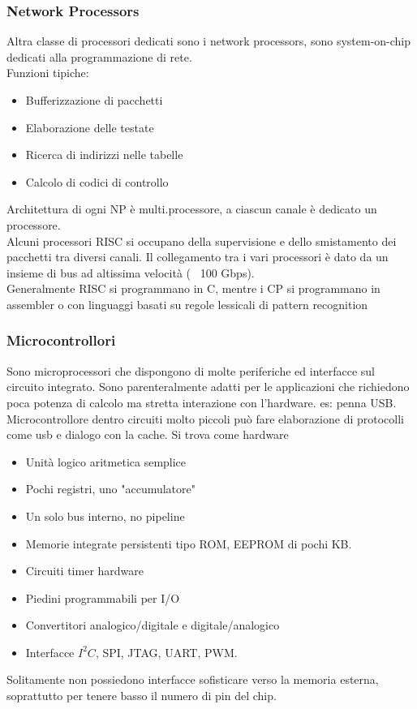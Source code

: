 \documentclass[12pt, oneside]{extbook}
\begin{document}
\subsubsection{Network Processors}
Altra classe di processori dedicati sono i network processors, sono system-on-chip dedicati alla programmazione di rete.\\ Funzioni tipiche:
\begin{itemize}
\item Bufferizzazione di pacchetti
\item Elaborazione delle testate
\item Ricerca di indirizzi nelle tabelle
\item Calcolo di codici di controllo
\end{itemize}
Architettura di ogni NP è multi.processore, a ciascun canale è dedicato un processore.\\ Alcuni processori RISC si occupano della supervisione e dello smistamento dei pacchetti tra diversi canali. Il collegamento tra i vari processori è dato da un insieme di bus ad altissima velocità (~ 100 Gbps).\\ Generalmente RISC si programmano in C, mentre i CP si programmano in assembler o con linguaggi basati su regole lessicali di pattern recognition
\subsubsection{Microcontrollori}
Sono microprocessori che dispongono di molte periferiche ed interfacce sul circuito integrato. Sono parenteralmente adatti per le applicazioni che richiedono poca potenza di calcolo ma stretta interazione con l'hardware. es: penna USB. Microcontrollore dentro circuiti molto piccoli può fare elaborazione di protocolli come usb e dialogo con la cache. Si trova come hardware
\begin{itemize}
\item Unità logico aritmetica semplice
\item Pochi registri, uno "accumulatore"
\item Un solo bus interno, no pipeline
\item Memorie integrate persistenti tipo ROM, EEPROM di pochi KB.
\item Circuiti timer hardware
\item Piedini programmabili per I/O
\item Convertitori analogico/digitale e digitale/analogico
\item Interfacce $I^2C$, SPI, JTAG, UART, PWM.
\end{itemize}
Solitamente non possiedono interfacce sofisticare verso la memoria esterna, soprattutto per tenere basso il numero di pin del chip.
\end{document}
